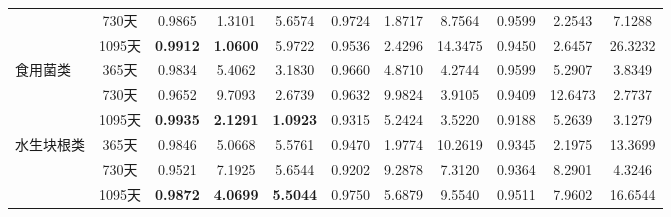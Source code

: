 \documentclass[lang=cn,12pt,a4paper]{elegantpaper}
\begin{document}
\begin{table}[H]
{\begin{tabular}{lcccccccccc}
      & 730天 & \color{red}0.9865 & \color{red}1.3101 & \color{red}5.6574 & 0.9724 & 1.8717 & 8.7564 & 0.9599 & 2.2543 & 7.1288 \\
      & 1095天 & \textbf{\color{red}0.9912} & \textbf{\color{red}1.0600} & \color{red}5.9722 & 0.9536 & 2.4296 & 14.3475 & 0.9450 & 2.6457 & 26.3232 \\
    \multirow{3}{*}{食用菌类} 
      & 365天 & \color{red}0.9834 & \color{red}5.4062 & \color{red}3.1830 & 0.9660 & 4.8710 & 4.2744 & 0.9599 & 5.2907 & 3.8349 \\
      & 730天 & \color{red}0.9652 & \color{red}9.7093 & \color{red}2.6739 & 0.9632 & 9.9824 & 3.9105 & 0.9409 & 12.6473 & 2.7737 \\
      & 1095天 & \textbf{\color{red}0.9935} & \textbf{\color{red}2.1291} & \textbf{\color{red}1.0923} & 0.9315 & 5.2424 & 3.5220 & 0.9188 & 5.2639 & 3.1279 \\
    \multirow{3}{*}{水生块根类} 
      & 365天 & \color{red}0.9846 & \color{red}5.0668 & \color{red}5.5761 & 0.9470 & 1.9774 & 10.2619 & 0.9345 & 2.1975 & 13.3699 \\
      & 730天 & \color{red}0.9521 & \color{red}7.1925 & \color{red}5.6544 & 0.9202 & 9.2878 & 7.3120 & 0.9364 & 8.2901 & 4.3246 \\
      & 1095天 & \textbf{\color{red}0.9872} & \textbf{\color{red}4.0699} & \textbf{\color{red}5.5044} & 0.9750 & 5.6879 & 9.5540 & 0.9511 & 7.9602 & 16.6544 \\
    \bottomrule
  \end{tabular}
  }
\end{table}
\end{document}
